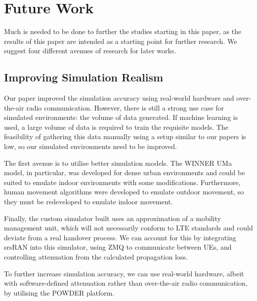 \section{Future Work}
Much is needed to be done to further the studies starting in this paper, as the results of this paper are intended as a starting point for further research. We suggest four different avenues of research for later works.

\subsection{Improving Simulation Realism}
Our paper improved the simulation accuracy using real-world hardware and over-the-air radio communication. However, there is still a strong use case for simulated environments: the volume of data generated. If machine learning is used, a large volume of data is required to train the requisite models. The feasibility of gathering this data manually using a setup similar to our papers is low, so our simulated environments need to be improved.

The first avenue is to utilise better simulation models. The WINNER UMa \cite{yajnanarayana_5g_2020} model, in particular, was developed for dense urban environments and could be suited to emulate indoor environments with some modifications. Furthermore, human movement algorithms were developed to emulate outdoor movement, so they must be redeveloped to emulate indoor movement.

Finally, the custom simulator built uses an approximation of a mobility management unit, which will not necessarily conform to LTE standards and could deviate from a real handover process. We can account for this by integrating srsRAN into this simulator, using ZMQ to communicate between UEs, and controlling attenuation from the calculated propagation loss.

To further increase simulation accuracy, we can use real-world hardware, albeit with software-defined attenuation rather than over-the-air radio communication, by utilising the POWDER platform. 

